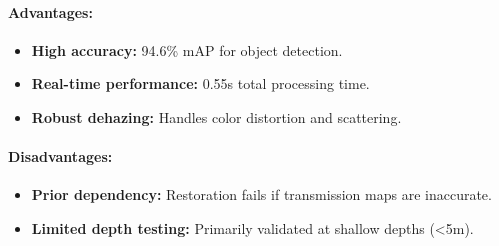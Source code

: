\paragraph{Advantages:}
\begin{itemize}
    \item \textbf{High accuracy:} 94.6\% mAP for object detection.
    \item \textbf{Real-time performance:} 0.55s total processing time.
    \item \textbf{Robust dehazing:} Handles color distortion and scattering.
\end{itemize}

\paragraph{Disadvantages:}
\begin{itemize}
    \item \textbf{Prior dependency:} Restoration fails if transmission maps are inaccurate.
    \item \textbf{Limited depth testing:} Primarily validated at shallow depths (\textless5m).
\end{itemize}